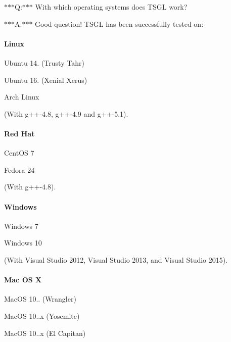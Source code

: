 $\ast$$\ast$$\ast$\-Q\-:$\ast$$\ast$$\ast$ With which operating systems does T\-S\-G\-L work?

$\ast$$\ast$$\ast$\-A\-:$\ast$$\ast$$\ast$ Good question! T\-S\-G\-L has been successfully tested on\-:

\paragraph*{Linux}


\begin{DoxyItemize}
\item Ubuntu 14. (Trusty Tahr)
\item Ubuntu 16. (Xenial Xerus)
\item Arch Linux
\end{DoxyItemize}

(With g++-\/4.8, g++-\/4.9 and g++-\/5.1).

\paragraph*{Red Hat}


\begin{DoxyItemize}
\item Cent\-O\-S 7
\item Fedora 24
\end{DoxyItemize}

(With g++-\/4.8).

\paragraph*{Windows}


\begin{DoxyItemize}
\item Windows 7
\item Windows 10
\end{DoxyItemize}

(With Visual Studio 2012, Visual Studio 2013, and Visual Studio 2015).

\paragraph*{Mac O\-S X}


\begin{DoxyItemize}
\item Mac\-O\-S 10.. (Wrangler)
\item Mac\-O\-S 10..\-x (Yosemite)
\item Mac\-O\-S 10..\-x (El Capitan)
\end{DoxyItemize}

